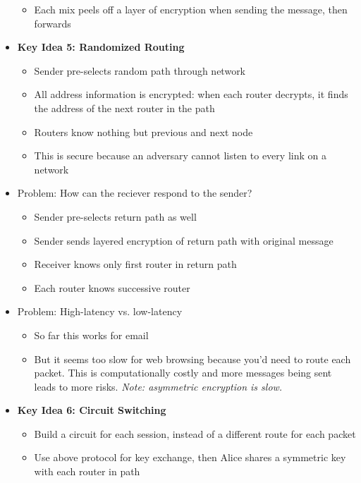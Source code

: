 \begin{itemize}
\begin{itemize}
                  \item Each mix peels off a layer of encryption when sending the message, then forwards
              \end{itemize}
     \item {\bf Key Idea 5: Randomized Routing} \begin{itemize}
                  \item Sender pre-selects random path through network
                  \item All address information is encrypted: when each router decrypts, it finds the address of the next router in the path
                 \item Routers know nothing but previous and next node
                 \item This is secure because an adversary cannot listen to every link on a network
              \end{itemize}
     \item Problem: How can the reciever respond to the sender? \begin{itemize}
                  \item Sender pre-selects return path as well
                  \item Sender sends layered encryption of return path with original message
                  \item Receiver knows only first router in return path
                  \item Each router knows successive router
              \end{itemize}
     \item Problem: High-latency vs. low-latency \begin{itemize}
                  \item So far this works for email
                  \item But it seems too slow for web browsing because you'd need to route each packet. This is computationally costly and more messages being sent leads to more risks. {\it Note: asymmetric encryption is slow.}
              \end{itemize}
     \item {\bf Key Idea 6: Circuit Switching} \begin{itemize}
                  \item Build a circuit for each session, instead of a different route for each packet
                  \item Use above protocol for key exchange, then Alice shares a symmetric key with each router in path

\end{itemize}
\end{itemize}

